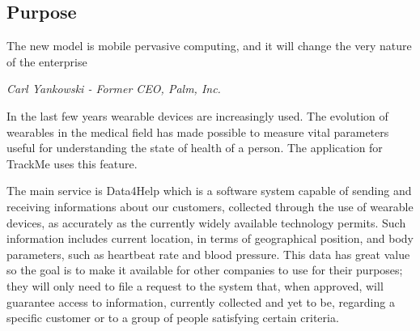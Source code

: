 \documentclass[../main.tex]{subfiles}
\begin{document}
\subsection{Purpose}

\epigraph{The new model is mobile pervasive computing, and it will change the very nature of the enterprise}{\textit{Carl Yankowski - Former CEO, Palm, Inc.}}





In the last few years wearable devices are increasingly used. The evolution of wearables in the medical field has made possible to measure vital parameters useful for understanding the state of health of a person. The application for TrackMe uses this feature.

The main service is Data4Help which is a software system capable of sending and receiving informations about our customers, collected through the use of wearable devices, as accurately as the currently widely available technology permits. Such information includes current location, in terms of geographical position, and body parameters, such as heartbeat rate and blood pressure.
This data has great value so the goal is to make it available for other companies to use for their purposes; they will only need to file a request to the system that, when approved, will guarantee access to information, currently collected and yet to be, regarding a specific customer or to a group of people satisfying certain criteria.
\end{document}
